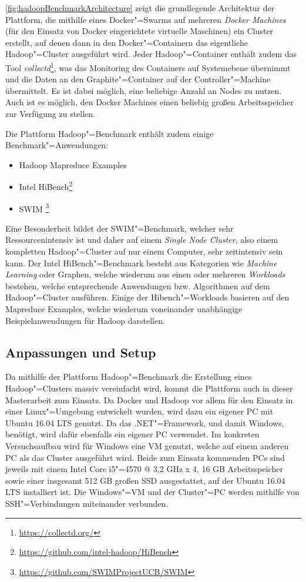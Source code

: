\autoref{fig:hadoopBenchmarkArchitecture} zeigt die grundlegende Architektur der Plattform, die mithilfe eines Docker"=Swarms auf mehreren \emph{Docker Machines} (für den Einsatz von Docker eingerichtete virtuelle Maschinen) ein Cluster erstellt, auf denen dann in den Docker"=Containern das eigentliche Hadoop"=Cluster ausgeführt wird.
Jeder Hadoop"=Container enthält zudem das Tool \emph{collectd}\footnote{\url{https://collectd.org/}}, was das Monitoring des Containers auf Systemebene übernimmt und die Daten an den Graphite"=Container auf der Controller"=Machine übermittelt.
Es ist dabei möglich, eine beliebige Anzahl an Nodes zu nutzen.
Auch ist es möglich, den Docker Machines einen beliebig großen Arbeitsspeicher zur Verfügung zu stellen.

Die Plattform Hadoop"=Benchmark enthält zudem einige Benchmark"=Anwendungen:

\begin{itemize}
    \item Hadoop Mapreduce Examples
    \item Intel HiBench\footnote{\url{https://github.com/intel-hadoop/HiBench}}
    \item \ac{SWIM} \footnote{\url{https://github.com/SWIMProjectUCB/SWIM}}
\end{itemize}

Eine Besonderheit bildet der SWIM"=Benchmark, welcher sehr Ressourcenintensiv ist und daher auf einem \emph{Single Node Cluster}, also einem kompletten Hadoop"=Cluster auf nur einem Computer, sehr zeitintensiv sein kann.
Der Intel HiBench"=Benchmark besteht aus Kategorien wie \emph{Machine Learning} oder Graphen, welche wiederum aus einen oder mehreren \emph{Workloads} bestehen, welche entsprechende Anwendungen bzw. Algorithmen auf dem Hadoop"=Cluster ausführen.
Einige der Hibench"=Workloads basieren auf den Mapreduce Examples, welche wiederum voneinander unabhängige Beispielanwendungen für Hadoop darstellen.

\subsection{Anpassungen und Setup}\label{sec:clusterFallstudie}

Da mithilfe der Plattform Hadoop"=Benchmark die Erstellung eines Hadoop"=Clusters massiv vereinfacht wird, kommt die Plattform auch in dieser Masterarbeit zum Einsatz.
Da Docker und Hadoop vor allem für den Einsatz in einer Linux"=Umgebung entwickelt wurden, wird dazu ein eigener PC mit Ubuntu 16.04 LTS genutzt.
Da \sS das .NET"=Framework, und damit Windows, benötigt, wird dafür ebenfalls ein eigener PC verwendet.
Im konkreten Versuchsaufbau wird für Windows eine VM genutzt, welche auf einem anderen PC als das Cluster ausgeführt wird.
Beide zum Einsatz kommenden PCs sind jeweils mit einem Intel Core i5"=4570 @ 3,2 GHz x 4, 16 GB Arbeitsspeicher sowie einer insgesamt 512 GB großen SSD ausgestattet, auf der Ubuntu 16.04 LTS installiert ist.
Die Windows"=VM und der Cluster"=PC werden mithilfe von SSH"=Verbindungen miteinander verbunden.

